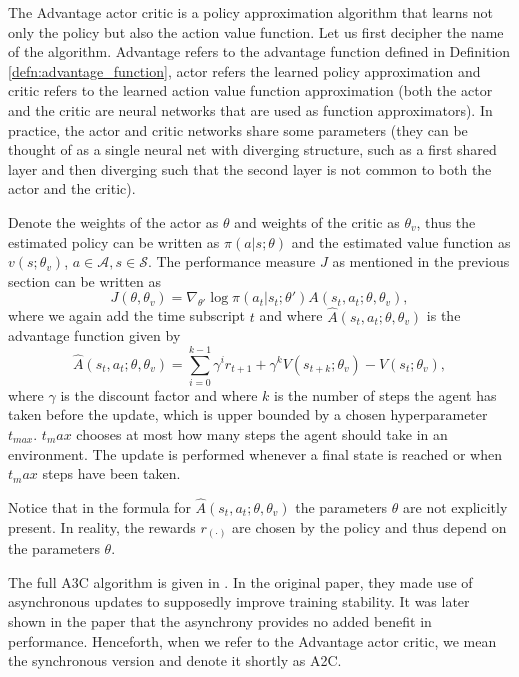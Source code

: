 The Advantage actor critic is a policy approximation algorithm that learns not only the policy but also the action value function. Let us first decipher the name of the algorithm. Advantage refers to the advantage function defined in Definition \ref{defn:advantage_function}, actor refers the learned policy approximation and critic refers to the learned action value function approximation (both the actor and the critic are neural networks that are used as function approximators). In practice, the actor and critic networks share some parameters (they can be thought of as a single neural net with diverging structure, such as a first shared layer and then diverging such that the second layer is not common to both the actor and the critic).

Denote the weights of the actor as $\theta$ and weights of the critic as $\theta_v$, thus the estimated policy can be written as $\pi(a|s;\theta)$ and the estimated value function as $v(s;\theta_v)$, $a \in \mathcal{A}, s \in \mathcal{S}$. The performance measure $J$ as mentioned in the previous section can be written as
\begin{equation}
J(\theta, \theta_v) = \nabla_{\theta'} \log \pi(a_t|s_t;\theta')A(s_t,a_t;\theta,\theta_v),
\end{equation}
where we again add the time subscript $t$ and where $\widehat{A}(s_t,a_t;\theta,\theta_v)$ is the advantage function given by 
\begin{equation}
\widehat{A}(s_t,a_t;\theta,\theta_v)=\sum_{i=0}^{k-1}\gamma^i r_{t+1} + \gamma^k V(s_{t+k};\theta_v) - V(s_{t};\theta_v),
\end{equation}
where $\gamma$ is the discount factor and where $k$ is the number of steps the agent has taken before the update, which is upper bounded by a chosen hyperparameter $t_{max}$. $t_max$ chooses at most how many steps the agent should take in an environment. The update is performed whenever a final state is reached or when $t_max$ steps have been taken.
\begin{rem}
Notice that in the formula for $\widehat{A}(s_t,a_t;\theta,\theta_v)$ the parameters $\theta$ are not explicitly present. In reality, the rewards $r_{(\cdot)}$ are chosen by the policy and thus depend on the parameters $\theta$.  
\end{rem}

The full A3C algorithm is given in \cite[Algorithm S3]{a3c_paper}.  In the original paper, they made use of asynchronous updates to supposedly improve training stability. It was later shown in the paper \cite{a3c_asynchrony_not_necessary} that the asynchrony provides no added benefit in performance. Henceforth, when we refer to the Advantage actor critic, we mean the synchronous version and denote it shortly as A2C.